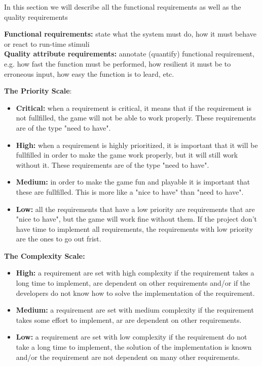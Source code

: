 In this section we will describe all the functional requirements
as well as the quality requirements

{\bf Functional requirements:} state what the system must do, how it must behave or react 
to run-time stimuli \\
{\bf Quality attribute requirements:} annotate (quantify) functional requirement, e.g. how fast 
the function must be performed, how resilient it must be to erroneous input, how easy the 
function is to leard, etc.

{\bf The Priority Scale}:
\begin{itemize}
	\item {\bf Critical:} when a requirement is critical, it means that if the requirement is
	not fullfilled, the game will not be able to work properly. These requirements are of the
	type "need to have".
	\item {\bf High:} when a requirement is highly prioritized, it is important that it will
	be fullfilled in order to make the game work properly, but it will still work without it.
	These requirements are of the type "need to have".
	\item {\bf Medium: } in order to make the game fun and playable it is important that these are 
	fullfilled. This is more like a "nice to have" than "need to have".
	\item {\bf Low:} all the requirements that have a low priority are requirements that are "nice to have",
	but the game will work fine without them. If the project don't have time to implement all
	requirements, the requirements with low priority are the ones to go out frist.
\end{itemize}

{\bf The Complexity Scale:}
\begin{itemize}
	\item {\bf High:} a requirement are set with high complexity if the requirement takes a long 
	time to implement, are dependent on other requirements and/or if the developers do not know
	how to solve the implementation of the requirement.
	\item {\bf Medium:} a requirement are set with medium complexity if the requirement takes 
	some effort to implement, ar are dependent on other requirements.
	\item {\bf Low:} a requirement are set with low complexity if the requirement do not take
	a long time to implement, the solution of the implementation is known and/or the requirement
	are not dependent on many other requirements.
\end{itemize}